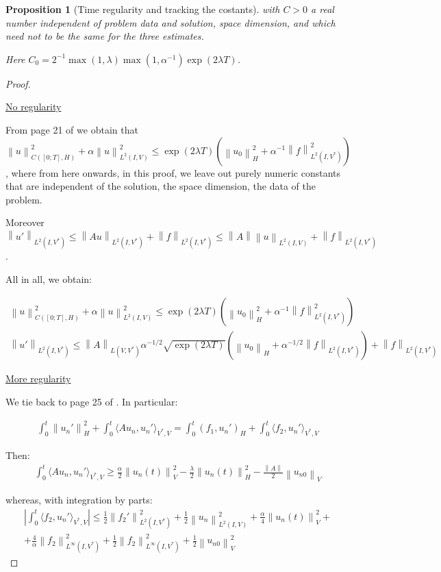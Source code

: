\documentclass[english,a4paper,9pt,oneside]{scrbook}	%
\theoremstyle{break}
\newtheorem{prop}[equation]{Proposition}
\newenvironment{mproof}[1][\proofname]{%
  \begin{proof}[#1]$ $\par\nobreak\ignorespaces
}{%
  \end{proof}
}
\renewcommand*{\proofname}{Proof}
\theoremstyle{remark}
\newcommand{\ds}{\displaystyle}
\newcommand{\norm}[1]{\left\lVert#1\right\rVert}
\newcommand{\HN}[1]{\norm{#1}_{H}}
\newcommand{\VN}[1]{\norm{#1}_{V}}
\begin{document}
\begin{appendices}
\begin{prop}[Time regularity and tracking the costants]
with $C>0$ a real number independent of problem data and solution, space dimension, and which need not to be the same for the three estimates. 

Here $C_0 = \ds 2^{-1}\max(1,\lambda)\max(1,\alpha^{-1})\exp(2\lambda T)$.

\end{prop}
\begin{mproof}

\underline{No regularity}

From page 21 of \cite{gilardi} we obtain that $\norm{u}^2_{C([0;T],H)}+\alpha\norm{u}_{L^2(I,V)}^2\leq \exp(2\lambda T)(\HN{u_0}^2+\alpha^{-1}\norm{f}^2_{L^2(I,V^*)})$, where from here onwards, in this proof, we leave out purely numeric constants that are independent of the solution, the space dimension, the data of the problem.

Moreover $\norm{u'}_{L^2(I,V^*)}\leq \norm{Au}_{L^2(I,V^*)}+\norm{f}_{L^2(I,V^*)}\leq \norm{A}\norm{u}_{L^2(I,V)}+\norm{f}_{L^2(I,V^*)}$.

All in all, we obtain:

\begin{align*}
\norm{u}^2_{C([0;T],H)}+\alpha\norm{u}_{L^2(I,V)}^2\leq \exp(2\lambda T)(\HN{u_0}^2+\alpha^{-1}\norm{f}^2_{L^2(I,V^*)})\\
\norm{u'}_{L^2(I,V^*)}\leq \norm{A}_{L(V,V^*)}	\alpha^{-1/2}\sqrt{\exp(2\lambda T)}(\HN{u_0}+\alpha^{-1/2}\norm{f}_{L^2(I,V^*)})+\norm{f}_{L^2(I,V^*)}
\end{align*}

\underline{More regularity}

We tie back to page 25 of \cite{gilardi}. In particular:

\begin{align*}
\int_0^t\HN{u_n'}^2+\int_0^t\langle A u_n, u_n'\rangle_{V^*,V}=\int_0^t(f_1,u_n')_H+\int_0^t \langle f_2, u_n'\rangle_{V^*,V}
\end{align*}


Then:
\begin{align*}
\int_0^t\langle A u_n, u_n'\rangle_{V^*,V}\geq \frac{\alpha}{2}\VN{u_n(t)}^2-\frac{\lambda}{2}\HN{u_n(t)}^2-\frac{\norm{A}}{2}\VN{u_{n0}}
\end{align*}

whereas, with integration by parts:
\begin{align*}
	\left | \int_0^t \langle f_2,u_n' \rangle_{V^*,V}\right | \leq
	\frac{1}{2}\norm{f_2'}_{L^2(I,V^*)}^2 + \frac{1}{2}\norm{u_n}_{L^2(I,V)}^2 + \frac{\alpha}{4}\VN{u_n(t)}^2 +\\
	+ \frac{4}{\alpha}\norm{f_2}_{L^\infty(I,V^*)}^2+ \frac{1}{2}\norm{f_2}_{L^\infty(I,V^*)}^2+\frac{1}{2}\VN{u_{n0}}^2
\end{align*}


\end{mproof}
\end{appendices}
\end{document}
